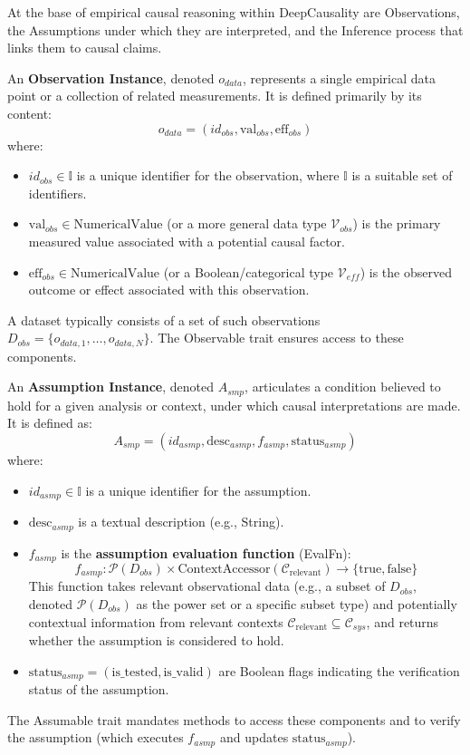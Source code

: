 At the base of empirical causal reasoning within DeepCausality are Observations, the Assumptions under which they are interpreted, and the Inference process that links them to causal claims.

An \textbf{Observation Instance}, denoted $o_{data}$, represents a single empirical data point or a collection of related measurements. It is defined primarily by its content:
\[ o_{data} = (id_{obs}, \text{val}_{obs}, \text{eff}_{obs}) \]
where:
\begin{itemize}
    \item $id_{obs} \in \mathbb{I}$ is a unique identifier for the observation, where $\mathbb{I}$ is a suitable set of identifiers.
    \item $\text{val}_{obs} \in \text{NumericalValue}$ (or a more general data type $\mathcal{V}_{obs}$) is the primary measured value associated with a potential causal factor.
    \item $\text{eff}_{obs} \in \text{NumericalValue}$ (or a Boolean/categorical type $\mathcal{V}_{eff}$) is the observed outcome or effect associated with this observation.
\end{itemize}
A dataset typically consists of a set of such observations $D_{obs} = \{o_{data,1}, \dots, o_{data,N}\}$. The Observable trait ensures access to these components.
\newline %

An \textbf{Assumption Instance}, denoted $A_{smp}$, articulates a condition believed to hold for a given analysis or context, under which causal interpretations are made. It is defined as:
\[ A_{smp} = (id_{asmp}, \text{desc}_{asmp}, f_{asmp}, \text{status}_{asmp}) \] %
where:
\begin{itemize}
    \item $id_{asmp} \in \mathbb{I}$ is a unique identifier for the assumption.
    \item $\text{desc}_{asmp}$ is a textual description (e.g., String).
    \item $f_{asmp}$ is the \textbf{assumption evaluation function} (EvalFn):
    \[ f_{asmp}: \mathcal{P}(D_{obs}) \times \text{ContextAccessor}(\mathcal{C}_{\text{relevant}}) \to \{\text{true}, \text{false}\} \]
    This function takes relevant observational data (e.g., a subset of $D_{obs}$, denoted $\mathcal{P}(D_{obs})$ as the power set or a specific subset type) and potentially contextual information from relevant contexts $\mathcal{C}_{\text{relevant}} \subseteq \mathcal{C}_{sys}$, and returns whether the assumption is considered to hold.
    \item $\text{status}_{asmp} = (\text{is\_tested}, \text{is\_valid})$ are Boolean flags indicating the verification status of the assumption.
\end{itemize}
The Assumable trait mandates methods to access these components and to verify the assumption (which executes $f_{asmp}$ and updates $\text{status}_{asmp}$).

